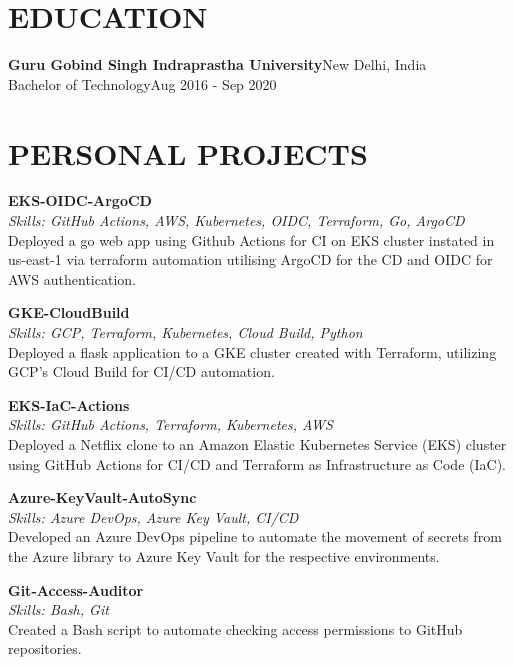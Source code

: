 \documentclass[11pt,a4paper]{article}
\begin{document}
\section*{EDUCATION}
\noindent\textbf{Guru Gobind Singh Indraprastha University}\hfill New Delhi, India\\
Bachelor of Technology\hfill Aug 2016 - Sep 2020

\section*{PERSONAL PROJECTS}
\noindent\textbf{EKS-OIDC-ArgoCD}\\
\textit{Skills: GitHub Actions, AWS, Kubernetes, OIDC, Terraform, Go, ArgoCD}\\
Deployed a go web app using Github Actions for CI on EKS cluster instated in us-east-1 via terraform automation utilising ArgoCD for the CD and OIDC for AWS authentication.
\vspace{0.5em}

\noindent\textbf{GKE-CloudBuild}\\
\textit{Skills: GCP, Terraform, Kubernetes, Cloud Build, Python}\\
Deployed a flask application to a GKE cluster created with Terraform, utilizing GCP's Cloud Build for CI/CD automation.
\vspace{0.5em}

\noindent\textbf{EKS-IaC-Actions}\\
\textit{Skills: GitHub Actions, Terraform, Kubernetes, AWS}\\
Deployed a Netflix clone to an Amazon Elastic Kubernetes Service (EKS) cluster using GitHub Actions for CI/CD and Terraform as Infrastructure as Code (IaC).
\vspace{0.5em}

\noindent\textbf{Azure-KeyVault-AutoSync}\\
\textit{Skills: Azure DevOps, Azure Key Vault, CI/CD}\\
Developed an Azure DevOps pipeline to automate the movement of secrets from the Azure library to Azure Key Vault for the respective environments.
\vspace{0.5em}

\noindent\textbf{Git-Access-Auditor}\\
\textit{Skills: Bash, Git}\\
Created a Bash script to automate checking access permissions to GitHub repositories.
\end{document}
